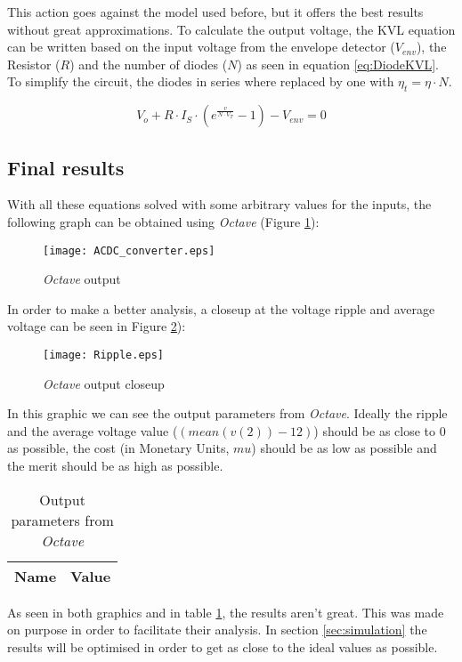 This action goes against the model used before, but it offers the best results without great approximations. To calculate the output voltage, the KVL equation can be written based on the input voltage from the envelope detector ($V_{env}$), the Resistor ($R$) and the number of diodes ($N$)  as seen in equation \ref{eq:DiodeKVL}. To simplify the circuit, the diodes in series where replaced by one with $\eta_t = \eta\cdot N$.

\begin{equation}
    V_o+R\cdot I_S\cdot (e^\frac{v}{N\cdot V_T}-1)-V_{env}=0
    \label{eq:DiodeKVL}
\end{equation}


\subsection{Final results}
\label{subsection:Octave_Results}
\indent

With all these equations solved with some arbitrary values for the inputs, the following graph can be obtained  using {\it Octave} (Figure \ref{fig:OctaveOut}):

\begin{figure}[H]
    \centering
    \texttt{[image: ACDC\_converter.eps]}
    \caption{{\it Octave} output}
    \label{fig:OctaveOut}
\end{figure}

In order to make a better analysis, a closeup at the voltage ripple and average voltage can be seen in Figure \ref{fig:OctaveOutClose}):

\begin{figure}[H]
    \centering
    \texttt{[image: Ripple.eps]}
    \caption{{\it Octave} output closeup}
    \label{fig:OctaveOutClose}
\end{figure}

In this graphic we can see the output parameters from {\it Octave}. Ideally the ripple and the average voltage value ($(mean(v(2))-12)$) should be as close to 0 as possible, the cost (in Monetary Units, $mu$) should be as low as possible and the merit should be as high as possible.

\begin{table}[H]
  \centering
  \begin{tabular}{|l|r|}
    \hline    
    {\bf Name} & {\bf Value} \\ \hline
    
  \end{tabular}
  \caption{Output parameters from {\it Octave} }
  \label{tab:OutputNGS}
\end{table}

As seen in both graphics and in table \ref{tab:OutputNGS}, the results aren't great. This was made on purpose in order to facilitate their analysis.
In section \ref{sec:simulation} the results will be optimised in order to get as close to the ideal values as possible.

